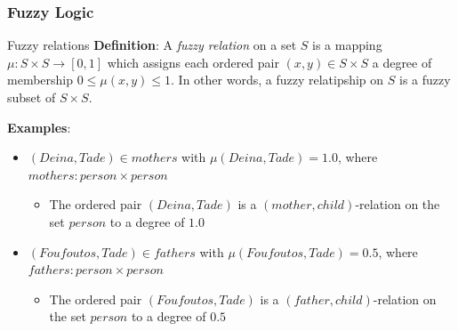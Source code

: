 
\begin{frame}
	\frametitle{Fuzzy Logic}

	\begin{block}{Fuzzy relations}
		\textbf{Definition}: A \textit{fuzzy relation} on a set $S$ is a mapping $\mu: S \times S \rightarrow [0, 1]$ which assigns each ordered pair $(x, y) \in S \times S$ a degree of membership $0 \le \mu(x, y) \le 1$. In other words, a fuzzy relatipship on $S$ is a fuzzy subset of $S \times S$.

		\vspace*{2em}

		\textbf{Examples}:
		\begin{itemize}
			\item $(Deina, Tade) \in mothers$ with $\mu(Deina, Tade) = 1.0$, where $mothers: person \times person$
			\begin{itemize}
				\item The ordered pair $(Deina, Tade)$ is a $(mother, child)$-relation on the set $person$ to a degree of $1.0$
			\end{itemize}
			\item $(Foufoutos, Tade) \in fathers$ with $\mu(Foufoutos, Tade) = 0.5$, where $fathers: person \times person$
			\begin{itemize}
				\item The ordered pair $(Foufoutos, Tade)$ is a $(father, child)$-relation on the set $person$ to a degree of $0.5$
			\end{itemize}
		\end{itemize}
	\end{block}
\end{frame}

